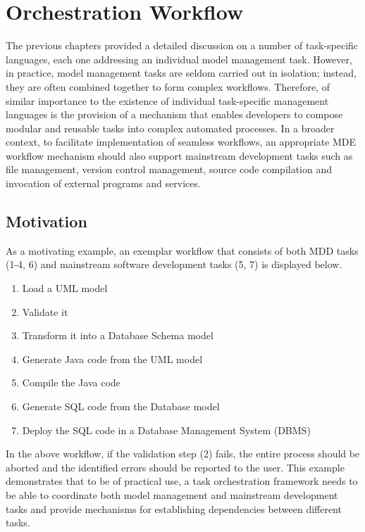 \clearpage
\chapter{Orchestration Workflow}
\label{chp:Workflow}

The previous chapters provided a detailed discussion on a number of task-specific languages, each one addressing an individual model management task. However, in practice, model management tasks are seldom carried out in isolation; instead, they are often combined together to form complex workflows. Therefore, of similar importance to the existence of individual task-specific management languages is the provision of a mechanism that enables developers to compose modular and reusable tasks into complex automated processes. In a broader context, to facilitate implementation of seamless workflows, an appropriate MDE workflow mechanism should also support mainstream development tasks such as file management, version control management, source code compilation and invocation of external programs and services.

\section{Motivation}
\label{sec:Workflow.Motivation}

As a motivating example, an exemplar workflow that consists of both MDD tasks (1-4, 6) and mainstream software development tasks (5, 7) is displayed below.

\begin{enumerate}
	\item Load a UML model
	\item Validate it
	\item Transform it into a Database Schema model
	\item Generate Java code from the UML model
	\item Compile the Java code
	\item Generate SQL code from the Database model
	\item Deploy the SQL code in a Database Management System (DBMS)
\end{enumerate}

In the above workflow, if the validation step (2) fails, the entire process should be aborted and the identified errors should be reported to the user. This example demonstrates that to be of practical use, a task orchestration framework needs to be able to coordinate both model management and mainstream development tasks and provide mechanisms for establishing dependencies between different tasks. 

